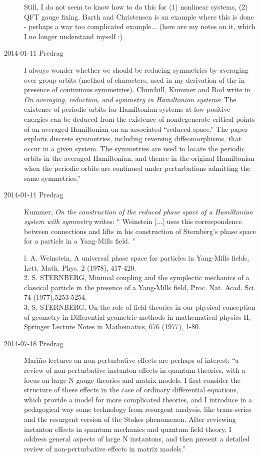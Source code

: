 \begin{description}
Still, I do not seem to know how to do this for (1) nonlinear systems,
(2) QFT gauge fixing. Barth and Christensen  is an example
where this is done - perhaps a way too complicated example... (here are
my notes 
{on it}, which I no longer understand myself :)

\item[2014-01-11 Predrag]
I always wonder whether we should be reducing symmetries
by averaging over group orbits (method of characters, used in
my derivation of the {\Fd} in presence of continuous symmetries).
Churchill, Kummer and Rod write in
{\em On averaging, reduction, and symmetry in {Hamiltonian} systems}:
The existence of periodic orbits for Hamiltonian systems at
low positive energies can be deduced from the existence of nondegenerate
critical points of an averaged Hamiltonian on an associated ``reduced
space.'' The paper exploits discrete symmetries, including reversing
diffeomorphisms, that occur in a given system. The symmetries are used to
locate the periodic orbits in the averaged Hamiltonian, and thence in the
original Hamiltonian when the periodic orbits are continued under
perturbations admitting the same symmetries.''

\item[2014-01-11 Predrag]
Kummer, {\em On the construction of the reduced phase space
of a {Hamiltonian} system with symmetry} writes:
``
Weinstein [...] uses this correspondence between connections
and lifts in his construction of Sternberg's phase space for a
particle in a Yang-Mills field.
''

l. A. Weinstein, A universal phase space for particles in Yang-Mills
fields, Lett. Math. Phys. 2 (1978), 417-420. \\
2. S. STERNBERG, Minimal coupling and the symplectic mechanics of a
classical particle in the presence of a Yang-Mills field, Proc. Nat.
Acad. Sci. 74 (1977),5253-5254. \\
3. S. STERNBERG, On the role of field theories in our physical conception
of geometry in Differential geometric methods in mathematical physics II,
Springer Lecture Notes in Mathematics,
676 (1977), 1-80. \\

\item[2014-07-18 Predrag]
Mari\~no lectures on non-perturbative effects are perhaps of
interest:
 ``a review of non-perturbative
instanton effects in quantum theories, with a focus on large N gauge
theories and matrix models. I first consider the structure of these
effects in the case of ordinary differential equations, which provide a
model for more complicated theories, and I introduce in a pedagogical way
some technology from resurgent analysis, like trans-series and the
resurgent version of the Stokes phenomenon. After reviewing instanton
effects in quantum mechanics and quantum field theory, I address general
aspects of large N instantons, and then present a detailed review of
non-perturbative effects in matrix models.''


\end{description}
